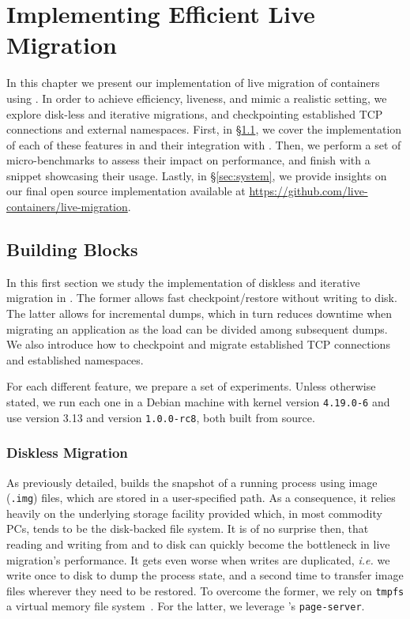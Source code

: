 \chapter{Implementing Efficient Live Migration} \label{chap:system}

In this chapter we present our implementation of live migration of \runc
containers using \criu.
In order to achieve efficiency, liveness, and mimic a realistic setting, we
explore disk-less and iterative migrations, and checkpointing established TCP
connections and external namespaces.
First, in \S\ref{sec:arch-blocks}, we cover the implementation of each of these
features in \criu and their integration with \runc.
Then, we perform a set of micro-benchmarks to assess their impact on
performance, and finish with a snippet showcasing their usage.
Lastly, in \S\ref{sec:system}, we provide insights on our final open source
implementation available at
\url{https://github.com/live-containers/live-migration}.

\section{Building Blocks} \label{sec:arch-blocks}

In this first section we study the implementation of diskless and iterative
migration in \criu.
The former allows fast checkpoint/restore without writing to disk.
The latter allows for incremental dumps, which in turn reduces downtime when
migrating an application as the load can be divided among subsequent dumps.
We also introduce how to checkpoint and migrate established TCP connections and
established namespaces.

For each different feature, we prepare a set of experiments.
Unless otherwise stated, we run each one in a Debian machine with kernel
version \texttt{4.19.0-6} and use \criu version 3.13 and \runc version
\texttt{1.0.0-rc8}, both built from source.

\subsection{Diskless Migration}

As previously detailed, \criu builds the snapshot of a running process using
image (\texttt{.img}) files, which are stored in a user-specified path.
As a consequence, it relies heavily on the underlying storage facility provided
which, in most commodity PCs, tends to be the disk-backed file system.
It is of no surprise then, that reading and writing from and to disk can
quickly become the bottleneck in live migration's performance.
It gets even worse when writes are duplicated, \textit{i.e.} we write once to
disk to dump the process state, and a second time to transfer image files
wherever they need to be restored.
To overcome the former, we rely on \texttt{tmpfs} a virtual memory file
system~\cite{tmpfs-manpage}.
For the latter, we leverage \criu's \texttt{page-server}.

